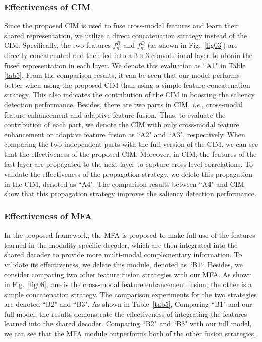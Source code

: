 \documentclass[10pt,twocolumn,letterpaper]{article}
\def\ie{\emph{i.e.}}
\begin{document}
\subsubsection{Effectiveness of CIM}

Since the proposed CIM is used to fuse cross-modal features and learn their shared representation, we utilize a direct concatenation strategy instead of the CIM. Specifically, the two features $f_m^R$ and $f_m^D$ (as shown in Fig.~\ref{fig03}) are directly concatenated and then fed into a $3\times{3}$ convolutional layer to obtain the fused representation in each layer. We denote this evaluation as ``A1" in Table \ref{tab5}. From the comparison results, it can be seen that our model performs better when using the proposed CIM than using a simple feature concatenation strategy. This also indicates the contribution of the CIM in boosting the saliency detection performance. Besides, there are two parts in CIM, \ie, cross-modal feature enhancement and adaptive feature fusion. Thus, to evaluate the contribution of each part, we denote the CIM with only cross-modal feature enhancement or adaptive feature fusion as ``A2" and ``A3", respectively. When comparing the two independent parts with the full version of the CIM, we can see that the effectiveness of the proposed CIM. Moreover, in CIM, the features of the last layer are propagated to the next layer to capture cross-level correlations. To validate the effectiveness of the propagation strategy, we delete this propagation in the CIM, denoted as ``A4". The comparison results between ``A4" and CIM show that this propagation strategy improves the saliency detection performance.



\subsubsection{Effectiveness of MFA}
\label{shared_ablation}

In the proposed framework, the MFA is proposed to make full use of the features learned in the modality-specific decoder, which are then integrated into the shared decoder to provide more multi-modal complementary information. To validate its effectiveness, we delete this module, denoted as ``B1“. Besides, we consider comparing two other feature fusion strategies with our MFA. As shown in Fig.~\ref{fig08}, one is the cross-modal feature enhancement fusion; the other is a simple concatenation strategy. The comparison experiments for the two strategies are denoted ``B2" and ``B3". As shown in Table~\ref{tab5}, Comparing ``B1" and our full model, the results demonstrate the effectiveness of integrating the features learned into the shared decoder. Comparing ``B2" and ``B3" with our full model, we can see that the MFA module outperforms both of the other fusion strategies.
\end{document}

